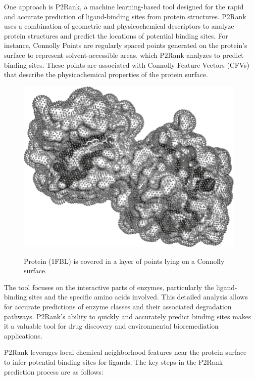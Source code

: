 One approach is P2Rank, a machine learning-based tool designed for the rapid and accurate prediction of ligand-binding sites from protein structures. P2Rank uses a combination of geometric and physicochemical descriptors to analyze protein structures and predict the locations of potential binding sites. For instance, Connolly Points are regularly spaced points generated on the protein’s surface to represent solvent-accessible areas, which P2Rank analyzes to predict binding sites. These points are associated with Connolly Feature Vectors (CFVs) that describe the physicochemical properties of the protein surface.
\begin{figure}[hbt]
    \centering
    \begin{minipage}[t]{\textwidth}
    \caption{Protein (1FBL) is covered in a layer of points lying on a Connolly surface.}
    \includegraphics[width=.7\textwidth]{img/connolly-points.png}\\
    \label{fig:connolly-points-p2rank}
    \end{minipage}
\end{figure}

The tool focuses on the interactive parts of enzymes, particularly the ligand-binding sites and the specific amino acids involved. This detailed analysis allows for accurate predictions of enzyme classes and their associated degradation pathways. P2Rank's ability to quickly and accurately predict binding sites makes it a valuable tool for drug discovery and environmental bioremediation applications.

P2Rank leverages local chemical neighborhood features near the protein surface to infer potential binding sites for ligands. The key steps in the P2Rank prediction process are as follows:

